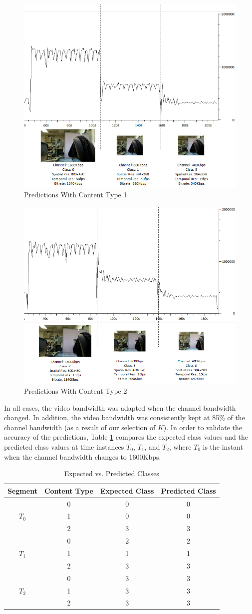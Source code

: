 \documentclass[a4paper,12pt]{article}
\begin{document}
\begin{figure}[h]
\centering
\includegraphics[width=0.5\linewidth]{TrainingExperimentSports.png}
\caption{Predictions With Content Type 1}
\label{fig:Sports}
\end{figure}
\begin{figure}[h]
\centering
\includegraphics[width=0.5\linewidth]{TrainingExperimentMedical.png}
\caption{Predictions With Content Type 2}
\label{fig:Medical}
\end{figure}
In all cases, the video bandwidth was adapted when the channel bandwidth changed. In addition, the video bandwidth was consistently kept at 85\% of the channel bandwidth (as a result of our selection of $K$). In order to validate the accuracy of the predictions, Table \ref{tab:PredictedClasses} compares the expected class values and the predicted class values at time instances $T_0$, $T_1$, and $T_2$, where $T_0$ is the instant when the channel bandwidth changes to 1600Kbps.
\begin{table} [h]
\caption{Expected vs. Predicted Classes}
\label{tab:PredictedClasses}
\begin{tabular}{c|c|c|c}
\textbf{Segment}&\textbf{Content Type}&\textbf{Expected Class}&\textbf{Predicted Class}\\
\hline
&0&0&0\\
$T_0$&1&0&0\\
&2&3&3\\
\hline
&0&2&2\\
$T_1$&1&1&1\\
&2&3&3\\
\hline
&0&3&3\\
$T_2$&1&3&3\\
&2&3&3\\
\end{tabular}
\end{table} 
\end{document}
